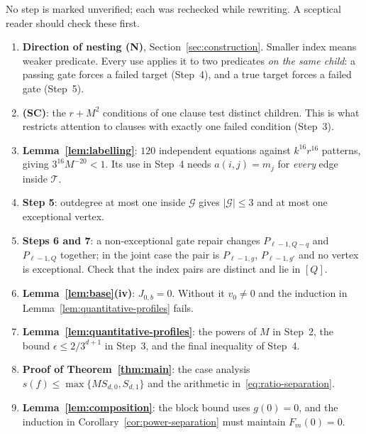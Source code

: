 \documentclass[11pt]{article}
\theoremstyle{definition}
\theoremstyle{remark}
\begin{document}
No step is marked unverified; each was rechecked while rewriting. A sceptical
reader should check these first.
\begin{enumerate}[nosep]
\item \textbf{Direction of nesting (N)}, Section~\ref{sec:construction}.
Smaller index means weaker predicate. Every use applies it to two predicates
\emph{on the same child}: a passing gate forces a failed target (Step~4),
and a true target forces a failed gate (Step~5).
\item \textbf{(SC)}: the $r+M^2$ conditions of one clause test distinct
children. This is what restricts attention to clauses with exactly one failed
condition (Step~3).
\item \textbf{Lemma~\ref{lem:labelling}}: $120$ independent equations against
$k^{16}r^{16}$ patterns, giving $3^{16}M^{-20}<1$. Its use in Step~4 needs
$a(i,j)=m_j$ for \emph{every} edge inside $\mathcal T$.
\item \textbf{Step 5}: outdegree at most one inside $\mathcal G$ gives
$|\mathcal G|\le3$ and at most one exceptional vertex.
\item \textbf{Steps 6 and 7}: a non-exceptional gate repair changes
$P_{\ell-1,Q-q}$ and $P_{\ell-1,Q}$ together; in the joint case the pair is
$P_{\ell-1,g}$, $P_{\ell-1,g'}$ and no vertex is exceptional. Check that the
index pairs are distinct and lie in $[Q]$.
\item \textbf{Lemma~\ref{lem:base}(iv)}: $J_{0,b}=0$. Without it $v_0\ne0$
and the induction in Lemma~\ref{lem:quantitative-profiles} fails.
\item \textbf{Lemma~\ref{lem:quantitative-profiles}}: the powers of $M$ in
Step~2, the bound $\epsilon\le2/3^{d+1}$ in Step~3, and the final inequality
of Step~4.
\item \textbf{Proof of Theorem~\ref{thm:main}}: the case analysis
$s(f)\le\max\{MS_{d,0},S_{d,1}\}$ and the arithmetic
in~\eqref{eq:ratio-separation}.
\item \textbf{Lemma~\ref{lem:composition}}: the block bound uses $g(0)=0$,
and the induction in Corollary~\ref{cor:power-separation} must maintain
$F_m(0)=0$.
\end{enumerate}



\end{document}
